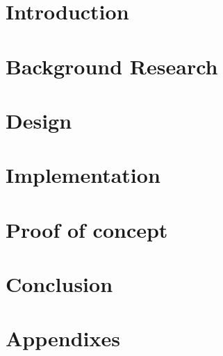 \documentclass[]{report}
\begin{document}
\graphicspath{{img/}{../img/}}



\tableofcontents



\chapter{Introduction}


\chapter{Background Research}


\chapter{Design}


\chapter{Implementation}


\chapter{Proof of concept}


\chapter{Conclusion}




\chapter{Appendixes}

\end{document}
